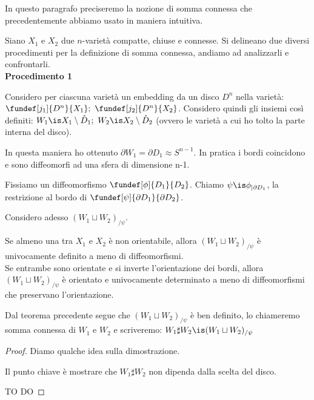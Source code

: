 

In questo paragrafo preciseremo la nozione di somma connessa che precedentemente abbiamo usato in maniera intuitiva.

Siano $X_1$ e $X_2$ due $n$-varietà compatte, chiuse e connesse. Si delineano due diversi procedimenti per la definizione di somma connessa, andiamo ad analizzarli e confrontarli.
\\

\textbf{Procedimento 1}

Considero per ciascuna varietà un embedding da un disco $D^n$ nella varietà:
$	\fundef[j_1]{D^n}{X_1}; ~\fundef[j_2]{D^n}{X_2}$. Considero quindi gli insiemi così definiti: $W_1 \is X_1 \setminus \mathring{D}_1; ~ W_2 \is X_2 \setminus \mathring{D}_2$ (ovvero le varietà a cui ho tolto la parte interna del disco).

In questa maniera ho ottenuto $\partial W_1 = \partial D_1 \approx S^{n-1}$. In pratica i bordi coincidono e sono diffeomorfi ad una sfera di dimensione n-1.

Fissiamo un diffeomorfismo $\fundef[\phi]{D_1}{D_2}$. Chiamo $\psi \is \phi_{|\partial D_1}$, la restrizione al bordo di $\fundef[\psi]{\partial D_1}{\partial D_2}$.

Considero adesso $(W_1 \sqcup W_2)_{/\psi}$.

\begin{teo}
Se almeno una tra $X_1$ e $X_2$ è non orientabile, allora $(W_1 \sqcup W_2)_{/\psi}$ è univocamente definito a meno di diffeomorfismi.\\
Se entrambe sono orientate e si inverte l'orientazione dei bordi, allora $(W_1 \sqcup W_2)_{/\psi}$ è orientato e univocamente determinato a meno di diffeomorfismi che preservano l'orientazione.
\end{teo}

\begin{defn}
Dal teorema precedente segue che $(W_1 \sqcup W_2)_{/\psi}$ è ben definito, lo chiameremo somma connessa di $W_1$ e $W_2$ e scriveremo: $W_1\sharp W_2 \is (W_1 \sqcup W_2)_{/\psi}$
\end{defn}

\begin{proof}
Diamo qualche idea sulla dimostrazione.

Il punto chiave è mostrare che $W_1 \sharp W_2$ non dipenda dalla scelta del disco.

TO DO
\end{proof}

